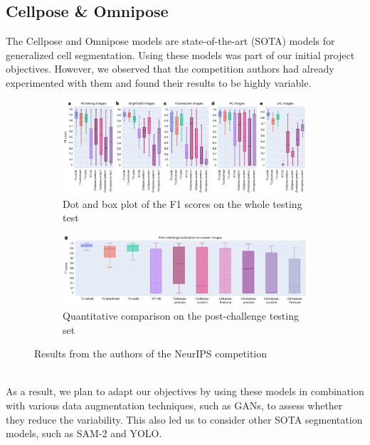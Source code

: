 \documentclass[]{article}
\begin{document}
\subsection{Cellpose \& Omnipose}
The Cellpose and Omnipose models are state-of-the-art (SOTA) models for generalized cell segmentation. Using these models was part of our initial project objectives. However, we observed that the competition authors had already experimented with them and found their results to be highly variable. 
\begin{figure}[!h]
    \centering
    \begin{subfigure}[b]{0.45\textwidth}
        \centering
        \includegraphics[width=\linewidth]{reports/images/cellpose_competition_stains.png}
        \caption{Dot and box plot of the
F1 scores on the whole testing test}
    \end{subfigure}
    \hfill
    \begin{subfigure}[b]{0.45\textwidth}
        \centering
        \includegraphics[width=\linewidth]{reports/images/cellpose_competition_test.png}
        \caption{Quantitative comparison on the post-challenge testing set}
    \end{subfigure}
    \caption{Results from the authors of the NeurIPS competition}
    \label{fig:transformed_images}
\end{figure}
\\As a result, we plan to adapt our objectives by using these models in combination with various data augmentation techniques, such as GANs, to assess whether they reduce the variability. This also led us to consider other SOTA segmentation models, such as SAM-2 and YOLO.
\end{document}
